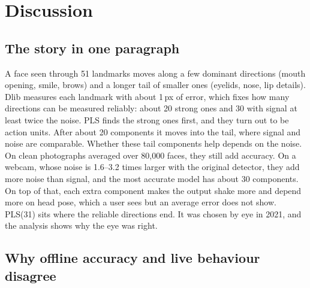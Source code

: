\documentclass[11pt,a4paper]{article}
\begin{document}
\section{Discussion}

\subsection{The story in one paragraph}

A face seen through 51 landmarks moves along a few dominant directions (mouth opening, smile,
brows) and a longer tail of smaller ones (eyelids, nose, lip details). Dlib measures each landmark
with about 1\,px of error, which fixes how many directions can be measured reliably: about 20
strong ones and 30 with signal at least twice the noise. PLS finds the strong ones first, and they
turn out to be action units. After about 20 components it moves into the tail, where signal and
noise are comparable. Whether these tail components help depends on the noise. On clean
photographs averaged over 80,000 faces, they still add accuracy. On a webcam, whose noise is
1.6--3.2 times larger with the original detector, they add more noise than signal, and the most
accurate model has about 30 components. On top of that, each extra component makes the output shake
more and depend more on head pose, which a user sees but an average error does not show. PLS(31)
sits where the reliable directions end. It was chosen by eye in 2021, and the analysis shows why
the eye was right.

\subsection{Why offline accuracy and live behaviour disagree}
\end{document}
